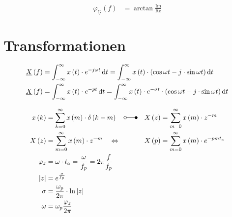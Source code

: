 \begin{boxleft}
\end{boxleft}\begin{boxrightshaded}
\begin{align*}
\varphi_{\underline{G}}\left(f\right)&=\arctan{\frac{\text{Im}}{\text{Re}}}
\end{align*}
\end{boxrightshaded}

\section{Transformationen}

\begin{boxleft}
\end{boxleft}\begin{boxrightshaded}
\begin{align*}
\underline{X}\left(f\right)&=\int_{-\infty}^{\infty}x\left(t\right)\cdot e^{-j\omega t} \mathop{}\!\mathrm{d} t=\int_{-\infty}^{\infty}x\left(t\right)\cdot \left(\cos{\omega t}-j\cdot\sin{\omega t}\right) \mathop{}\!\mathrm{d} t\\
\underline{X}\left(f\right)&=\int_{-\infty}^{\infty}x\left(t\right)\cdot e^{-p t} \mathop{}\!\mathrm{d} t=\int_{-\infty}^{\infty}x\left(t\right)\cdot e^{-\sigma t}\cdot \left(\cos{\omega t}-j\cdot\sin{\omega t}\right) \mathop{}\!\mathrm{d} t
\end{align*}
\end{boxrightshaded}

\begin{boxleft}
\end{boxleft}\begin{boxrightshaded}
\begin{align*}
x\left(k\right)&=\sum\limits_{k=0}^\infty x\left(m\right)\cdot\delta\left(k-m\right)\quad\laplace&& X\left(z\right)=\sum\limits_{m=0}^\infty x\left(m\right)\cdot z^{-m}\\
X\left(z\right)&=\sum\limits_{m=0}^\infty x\left(m\right)\cdot z^{-m} \quad\Leftrightarrow&& X\left(p\right)=\sum\limits_{m=0}^\infty x\left(m\right)\cdot e^{-pmt_a}\\
\varphi_z&=\omega\cdot t_a=\frac{\omega}{f_p}=2\pi\frac{f}{f_p}\\
\left|z\right|&=e^\frac{\sigma}{f_p}\\
\sigma&=\frac{\omega_p}{2\pi}\cdot \ln{\left|z\right|}\\
\omega&=\omega_p\frac{\varphi_z}{2\pi}
\end{align*}
\end{boxrightshaded}

